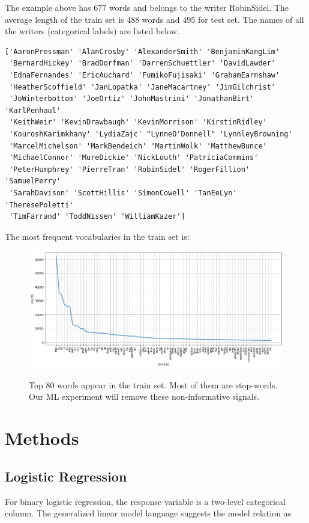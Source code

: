 \documentclass{article}
\begin{document}
The example above has 677 words and belongs to the writer RobinSidel. The average length of the train set is 488 words and 495 for test set. The names of all the writers (categorical labels) are listed below.
\begin{verbatim}
['AaronPressman' 'AlanCrosby' 'AlexanderSmith' 'BenjaminKangLim'
 'BernardHickey' 'BradDorfman' 'DarrenSchuettler' 'DavidLawder'
 'EdnaFernandes' 'EricAuchard' 'FumikoFujisaki' 'GrahamEarnshaw'
 'HeatherScoffield' 'JanLopatka' 'JaneMacartney' 'JimGilchrist'
 'JoWinterbottom' 'JoeOrtiz' 'JohnMastrini' 'JonathanBirt' 'KarlPenhaul'
 'KeithWeir' 'KevinDrawbaugh' 'KevinMorrison' 'KirstinRidley'
 'KouroshKarimkhany' 'LydiaZajc' "LynneO'Donnell" 'LynnleyBrowning'
 'MarcelMichelson' 'MarkBendeich' 'MartinWolk' 'MatthewBunce'
 'MichaelConnor' 'MureDickie' 'NickLouth' 'PatriciaCommins'
 'PeterHumphrey' 'PierreTran' 'RobinSidel' 'RogerFillion' 'SamuelPerry'
 'SarahDavison' 'ScottHillis' 'SimonCowell' 'TanEeLyn' 'TheresePoletti'
 'TimFarrand' 'ToddNissen' 'WilliamKazer']
\end{verbatim}

The most frequent vocabularies in the train set is:

\begin{figure}[htbp]
  {\includegraphics[width=\textwidth]{fd.png}}
    {\caption{Top 80 words appear in the train set. Most of them are stop-words. Our ML experiment will remove these non-informative signals.} \label{fig:year}}
\end{figure}


\section{Methods}

\subsection{Logistic Regression}
For binary logistic regression, the response variable is a two-level categorical column. The generalized linear model language suggests the model relation as
\end{document}
